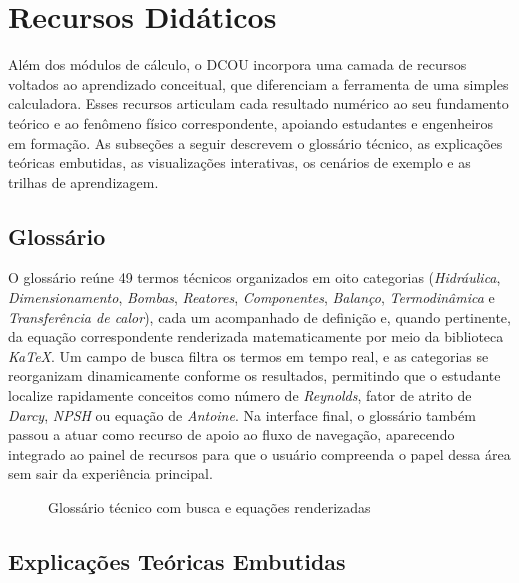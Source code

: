 \section{Recursos Didáticos}

Além dos módulos de cálculo, o DCOU incorpora uma camada de recursos voltados ao aprendizado conceitual, que diferenciam a ferramenta de uma simples calculadora. Esses recursos articulam cada resultado numérico ao seu fundamento teórico e ao fenômeno físico correspondente, apoiando estudantes e engenheiros em formação. As subseções a seguir descrevem o glossário técnico, as explicações teóricas embutidas, as visualizações interativas, os cenários de exemplo e as trilhas de aprendizagem.

\subsection{Glossário}

O glossário reúne 49 termos técnicos organizados em oito categorias (\textit{Hidráulica}, \textit{Dimensionamento}, \textit{Bombas}, \textit{Reatores}, \textit{Componentes}, \textit{Balanço}, \textit{Termodinâmica} e \textit{Transferência de calor}), cada um acompanhado de definição e, quando pertinente, da equação correspondente renderizada matematicamente por meio da biblioteca \textit{KaTeX}. Um campo de busca filtra os termos em tempo real, e as categorias se reorganizam dinamicamente conforme os resultados, permitindo que o estudante localize rapidamente conceitos como número de \textit{Reynolds}, fator de atrito de \textit{Darcy}, \textit{NPSH} ou equação de \textit{Antoine}. Na interface final, o glossário também passou a atuar como recurso de apoio ao fluxo de navegação, aparecendo integrado ao painel de recursos para que o usuário compreenda o papel dessa área sem sair da experiência principal.

\begin{figure}[H]
    \centering
    \caption{Glossário técnico com busca e equações renderizadas}
    \label{fig:glossario}
\end{figure}

\subsection{Explicações Teóricas Embutidas}

